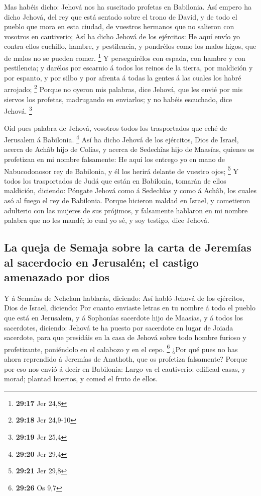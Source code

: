  Mas habéis dicho: Jehová nos ha suscitado profetas en
Babilonia.  Así empero ha dicho Jehová, del rey que está
sentado sobre el trono de David, y de todo el pueblo que mora en esta
ciudad, de vuestros hermanos que no salieron con vosotros en cautiverio;
 Así ha dicho Jehová de los ejércitos: He aquí envío yo
contra ellos cuchillo, hambre, y pestilencia, y pondrélos como los malos
higos, que de malos no se pueden comer. \footnote{\textbf{29:17} Jer
  24,8}  Y perseguirélos con espada, con hambre y con
pestilencia; y darélos por escarnio á todos los reinos de la tierra, por
maldición y por espanto, y por silbo y por afrenta á todas la gentes á
las cuales los habré arrojado; \footnote{\textbf{29:18} Jer 24,9-10}
 Porque no oyeron mis palabras, dice Jehová, que les
envié por mis siervos los profetas, madrugando en enviarlos; y no habéis
escuchado, dice Jehová. \footnote{\textbf{29:19} Jer 25,4}

 Oid pues palabra de Jehová, vosotros todos los
trasportados que eché de Jerusalem á Babilonia. \footnote{\textbf{29:20}
  Jer 29,4}  Así ha dicho Jehová de los ejércitos, Dios
de Israel, acerca de Achâb hijo de Colías, y acerca de Sedechîas hijo de
Maasías, quienes os profetizan en mi nombre falsamente: He aquí los
entrego yo en mano de Nabucodonosor rey de Babilonia, y él los herirá
delante de vuestro ojos; \footnote{\textbf{29:21} Jer 29,8}
 Y todos los trasportados de Judá que están en Babilonia,
tomarán de ellos maldición, diciendo: Póngate Jehová como á Sedechîas y
como á Achâb, los cuales asó al fuego el rey de Babilonia.
 Porque hicieron maldad en Israel, y cometieron adulterio
con las mujeres de sus prójimos, y falsamente hablaron en mi nombre
palabra que no les mandé; lo cual yo sé, y soy testigo, dice Jehová.

\hypertarget{la-queja-de-semaja-sobre-la-carta-de-jeremuxedas-al-sacerdocio-en-jerusaluxe9n-el-castigo-amenazado-por-dios}{%
\subsection{La queja de Semaja sobre la carta de Jeremías al sacerdocio
en Jerusalén; el castigo amenazado por
dios}\label{la-queja-de-semaja-sobre-la-carta-de-jeremuxedas-al-sacerdocio-en-jerusaluxe9n-el-castigo-amenazado-por-dios}}

 Y á Semaías de Nehelam hablarás, diciendo:
 Así habló Jehová de los ejércitos, Dios de Israel,
diciendo: Por cuanto enviaste letras en tu nombre á todo el pueblo que
está en Jerusalem, y á Sophonías sacerdote hijo de Maasías, y á todos
los sacerdotes, diciendo:  Jehová te ha puesto por
sacerdote en lugar de Joiada sacerdote, para que presidáis en la casa de
Jehová sobre todo hombre furioso y profetizante, poniéndolo en el
calabozo y en el cepo. \footnote{\textbf{29:26} Os 9,7} 
¿Por qué pues no has ahora reprendido á Jeremías de Anathoth, que os
profetiza falsamente?  Porque por eso nos envió á decir
en Babilonia: Largo va el cautiverio: edificad casas, y morad; plantad
huertos, y comed el fruto de ellos.

